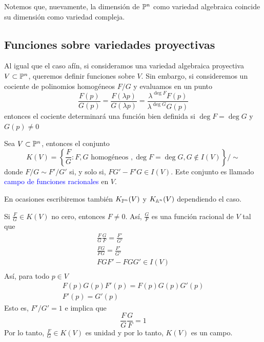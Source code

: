     Notemos que, nuevamente, la dimensión de $\mathbb{P}^n$ como variedad algebraica coincide su dimensión como variedad compleja.

    \subsection{Funciones sobre variedades proyectivas}

    Al igual que el caso afín, si consideramos una variedad algebraica proyectiva $V\subset\mathbb{P}^n$, queremos definir funciones sobre $V$. Sin embargo, si consideremos un cociente de polinomios homogéneos $F/G$ y evaluamos en un punto
    \begin{equation*}
        \frac{F(p)}{G(p)}=\frac{F(\lambda p)}{G(\lambda p)}=\frac{\lambda^{\deg F}F(p)}{\lambda^{\deg G}G(p)}
    \end{equation*}
    entonces el cociente determinará una función bien definida si $\deg F=\deg G$ y $G(p)\neq 0$ 
    
    \begin{definition}
        Sea $V\subset \mathbb{P}^n$, entonces el conjunto
        $$ K(V)=\left\{\frac{F}{G}:F,G\text{ homogéneos },\deg F=\deg G, G\not\in I(V) \right\}/\sim$$
        donde $F/G\sim F'/G'$ si, y solo si, $FG'-F'G\in I(V)$. Este conjunto es llamado \textcolor{blue}{campo de funciones racionales} en $V$.\\
    \end{definition}
    
    En ocasiones escribiremos también $K_{\mathbb{P}^n}(V)$ y $K_{\mathbb{A}^n}(V)$ dependiendo el caso.

    \begin{remark}
        Si $\frac{F}{G}\in K(V)$ no cero, entonces $F\neq 0$. Así, $\frac{G}{F}$ es una función racional de $V$ tal que
        \begin{gather*}
            \frac{F}{G}\frac{G}{F}=\frac{F'}{G'}\\
            \frac{FG}{FG}=\frac{F'}{G'}\\
            FGF'-FGG'\in I(V)\\
        \end{gather*}
        Así, para todo $p\in V$
        \begin{gather*}
            F(p)G(p)F'(p)=F(p)G(p)G'(p)\\
            F'(p)=G'(p)
        \end{gather*}
        Esto es, $F'/G'=1$ e implica que
        \begin{equation*}
            \frac{F}{G}\frac{G}{F}=1
        \end{equation*}
        Por lo tanto, $\frac{F}{G}\in K(V)$ es unidad y por lo tanto, $K(V)$ es un campo.
    \end{remark}

